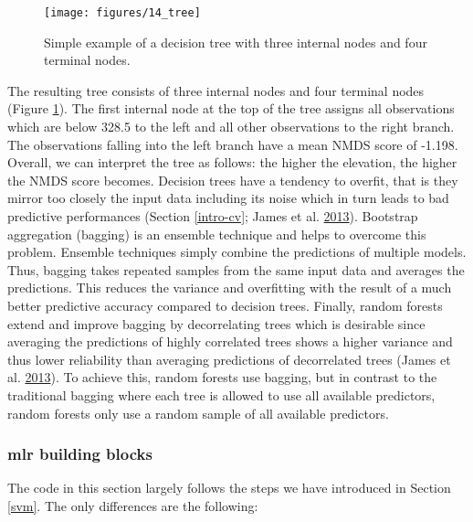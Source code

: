 \documentclass[]{krantz}
\begin{document}
\begin{figure}[t]

{\centering \texttt{[image: figures/14\_tree]} 

}

\caption[Simple example of a decision tree.]{Simple example of a decision tree with three internal nodes and four terminal nodes.}\label{fig:tree}
\end{figure}

The resulting tree consists of three internal nodes and four terminal nodes (Figure \ref{fig:tree}).
The first internal node at the top of the tree assigns all observations which are below 328.5 to the left and all other observations to the right branch.
The observations falling into the left branch have a mean NMDS score of -1.198.
Overall, we can interpret the tree as follows: the higher the elevation, the higher the NMDS score becomes.
Decision trees have a tendency to overfit, that is they mirror too closely the input data including its noise which in turn leads to bad predictive performances (Section \ref{intro-cv}; James et al. \protect\hyperlink{ref-james_introduction_2013}{2013}).
Bootstrap aggregation (bagging) is an ensemble technique and helps to overcome this problem.
Ensemble techniques simply combine the predictions of multiple models.
Thus, bagging takes repeated samples from the same input data and averages the predictions.
This reduces the variance and overfitting with the result of a much better predictive accuracy compared to decision trees.
Finally, random forests extend and improve bagging by decorrelating trees which is desirable since averaging the predictions of highly correlated trees shows a higher variance and thus lower reliability than averaging predictions of decorrelated trees (James et al. \protect\hyperlink{ref-james_introduction_2013}{2013}).
To achieve this, random forests use bagging, but in contrast to the traditional bagging where each tree is allowed to use all available predictors, random forests only use a random sample of all available predictors.

\hypertarget{mlr-building-blocks}{%
\subsubsection{\texorpdfstring{\textbf{mlr} building blocks}{mlr building blocks}}\label{mlr-building-blocks}}

The code in this section largely follows the steps we have introduced in Section \ref{svm}.
The only differences are the following:
\end{document}
